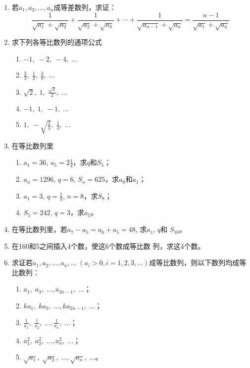 \begin{enumerate}
\item 若$a_1,a_2,\ldots,a_n$成等差数列，求证：
\[\frac{1}{\sqrt{a_1}+\sqrt{a_2}}+\frac{1}{\sqrt{a_2}+\sqrt{a_3}}+\cdots +\frac{1}{\sqrt{a_{n-1}}+\sqrt{a_n}}=\frac{n-1}{\sqrt{a_1}+\sqrt{a_n}}\]

\item 求下列各等比数列的通项公式
\begin{multicols}{2}
\begin{enumerate}
    \item $-1,\;-2,\;-4,\;\ldots$
    \item $\frac{2}{3},\;\frac{1}{2},\;\frac{3}{8},\;\ldots$
    \item $\sqrt{2},\;1,\;\frac{\sqrt{2}}{2},\;\ldots$
    \item $-1,\;1,\;-1,\;\ldots$
    \item $1,\;-\sqrt{\frac{1}{3}},\;\frac{1}{3},\;\ldots$
\end{enumerate}
\end{multicols}

\item 在等比数列里
\begin{enumerate}
    \item $a_1=36$, $a_5=2\frac{1}{4}$，求$q$和$S_5$；
    \item $a_n=1296$, $q=6$, $S_n=625$，求$a_0$和$a_1$；
    \item $a_1=3$, $q=\frac{1}{3}$, $n=8$，求$S_8$；
    \item $S_5=242$, $q=3$，求$a_5$。
\end{enumerate}
\item 在等比数列里，若$a_7-a_5=a_6+a_5=48$, 求$a_1$, $q$和
$S_{10}$。
\item 在160和5之间插入4个数，使这6个数成等比数
列，求这4个数。
\item 求证若$a_1,a_2,\ldots,a_n,\ldots\; (a_i>0,i=1,2,3,
\ldots)$成等比数列，则以下数列均成等比数列：
\begin{multicols}{2}
\begin{enumerate}
    \item $a_1,\; a_3,\; \ldots, a_{2n-1},\; \ldots$；
    \item $ka_1,\; ka_3,\; \ldots, ka_{2n-1},\; \ldots$；
    \item $\frac{1}{a_1},\; \frac{1}{a_2},\; \ldots, \frac{1}{a_{n}},\; \ldots$；
    \item $a^2_1,\; a^2_2,\; \ldots, a^2_{n},\; \ldots$；
    \item $\sqrt{a_1},\; \sqrt{a_2},\; \ldots, \sqrt{a_n},\; \ldots$。
\end{enumerate}
\end{multicols}


\end{enumerate}
